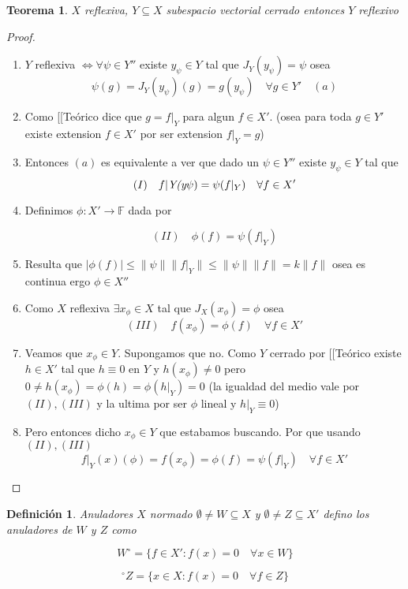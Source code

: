 \documentclass[10pt]{extarticle}
\theoremstyle{break}
\newtheorem{theorem}{Teorema}[section]
\newtheorem{definition}{Definición}[section]
\theoremstyle{definition}
\begin{document}
\begin{theorem}\label{12.4}
$X$ reflexiva, $Y\subseteq X$ subespacio vectorial cerrado entonces $Y$ reflexivo
\end{theorem}
\begin{proof}
	\begin{enumerate}
		\item $Y$ reflexiva $\iff \forall \psi\in Y''$ existe $y_{\psi}\in Y$ tal que $J_{Y}(y_{\psi})=\psi$ osea
			$$\psi(g)=J_{Y}(y_{\psi})(g)= g(y_{\psi})\quad\forall g\in Y' \quad (a)$$

		\item Como [[Teórico dice que $g=f|_{Y}$ para algun $f\in X'$. (osea para toda $g\in Y'$ existe extension $f\in X'$ por ser extension $f|_{Y}=g$)
		\item Entonces $(a)$ es equivalente a ver que dado un $\psi \in Y''$ existe $y_{\psi}\in Y$ tal que
			$$(I)\quad f|\emph{{Y}(y}{\psi})=\psi(f|_{Y})\quad\forall f\in X'$$
		\item Definimos $\phi:X'\rightarrow\mathbb{F}$ dada por

	$$(II)\quad\phi (f)=\psi(f|_{Y})$$

		\item Resulta que $\lvert \phi(f) \rvert\leq \lVert \psi \rVert\lVert f|_{Y} \rVert\leq \lVert \psi \rVert\lVert f \rVert=k\lVert f \rVert$ osea es continua ergo $\phi\in X''$
		\item Como $X$ reflexiva $\exists x_{\phi}\in X$ tal que $J_{X}(x_{\phi})=\phi$ osea
	$$(III)\quad f(x_{\phi})=\phi(f)\quad\forall f\in X'$$
		\item Veamos que $x_{\phi}\in Y$. Supongamos que no. Como $Y$ cerrado por [[Teórico existe $h\in X'$ tal que $h\equiv 0$ en $Y$ y $h(x_{\phi})\neq 0$ pero $0\neq h(x_{\phi})=\phi(h)=\phi(h|_{Y})=0$ (la igualdad del medio vale por $(II),(III)$ y la ultima por ser $\phi$ lineal y $h|_{Y}\equiv 0$)
		\item Pero entonces dicho $x_{\phi}\in Y$ que estabamos buscando. Por que usando $(II),(III)$
			$$f|_{Y}(x)(\phi)=f(x_{\phi})=\phi(f)=\psi(f|_{Y})\quad\forall f\in X'$$
	\end{enumerate}
	\end{proof}

\begin{definition} Anuladores
$X$ normado $\emptyset \neq W\subseteq X$ y $\emptyset\neq Z\subseteq X'$ defino los anuladores de $W$ y $Z$ como

	$$W^{\circ} =\{f\in X':f(x) =0\quad\forall x\in W \}$$

	$$^{\circ}Z= \{x \in X : f(x)=0\quad\forall f\in Z \}$$
\end{definition}
\end{document}
